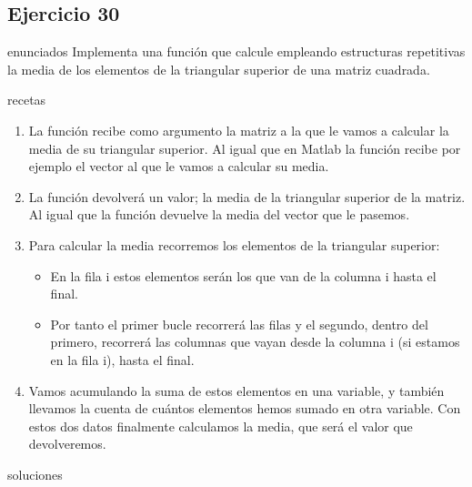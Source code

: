 \subsection{Ejercicio 30}
\def\parte{enunciados}
\ifx\capitulo\parte
Implementa una función que calcule empleando estructuras repetitivas la media de los elementos de la triangular superior de una matriz cuadrada.
\fi

\def\parte{recetas}
\ifx\capitulo\parte
\begin{enumerate}
\item La función recibe como argumento la matriz a la que le vamos a calcular la media de su triangular superior. Al igual que en Matlab la función  recibe por ejemplo el vector al que le vamos a calcular su media.
\item La función devolverá un valor; la media de la triangular superior de la matriz. Al igual que  la función  devuelve la media del vector que le pasemos.
\item Para calcular la media recorremos los elementos de la triangular superior:
  \begin{itemize}
  \item En la fila i estos elementos serán los que van de la columna i hasta el final.
  \item Por tanto el primer bucle recorrerá las filas y el segundo, dentro del primero, recorrerá las columnas que vayan desde la columna i (si estamos en la fila i), hasta el final.
  \end{itemize}
\item Vamos acumulando la suma de estos elementos en una variable, y también llevamos la cuenta de cuántos elementos hemos sumado en otra variable. Con estos dos datos finalmente calculamos la media, que será el valor que devolveremos.
\end{enumerate}
\fi

\def\parte{soluciones}
\ifx\capitulo\parte

\fi
